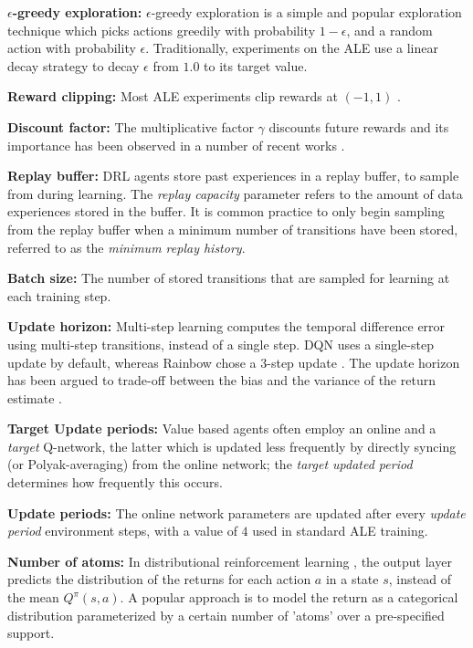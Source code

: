{\bf $\epsilon$-greedy exploration: } 
$\epsilon$-greedy exploration is a simple and popular exploration technique which picks actions greedily with probability $1-\epsilon$, and a random action with probability $\epsilon$. Traditionally, experiments on the ALE use a linear decay strategy to decay $\epsilon$ from $1.0$ to its target value.

{\bf Reward clipping: } 
Most ALE experiments clip rewards at $(-1, 1)$ \citep{mnih2015humanlevel}.

{\bf Discount factor: } 
The multiplicative factor $\gamma$ discounts future rewards and its importance has been observed in a number of recent works \citep{amit2020discount, hessel19inductive, gelada2019off, vanseijen2019using, francoislavet2016discount,schwarzer23a}.

{\bf Replay buffer: }  
DRL agents  store past experiences in a replay buffer, to sample from during learning. The {\em replay capacity} parameter refers to the amount of data experiences stored in the buffer. 
It is common practice to only begin sampling from the replay buffer when a minimum number of transitions have been stored, referred to as the {\em minimum replay history}.


{\bf Batch size: } 
The number of stored transitions that are sampled for learning at each training step.

{\bf Update horizon: }
Multi-step learning \citep{sutton88learning} computes the temporal difference error using multi-step transitions, instead of a single step. DQN uses a single-step update by default, whereas Rainbow chose a 3-step update \citep{Hessel2018RainbowCI}. The update horizon has been argued to trade-off between the bias and the variance of the return estimate \citep{biasandvariance_kea}. 


{\bf Target Update periods: }
Value based agents often employ an online and a {\em target} Q-network, the latter which is updated less frequently by directly syncing (or Polyak-averaging) from the online network; the {\em target updated period} determines how frequently this occurs.


{\bf Update periods: }
The online network parameters are updated after every {\em update period} environment steps, with a value of $4$ used in standard ALE training.

{\bf Number of atoms: } 
In distributional reinforcement learning \citep{Bellemare2017ADP}, the output layer predicts the distribution of the returns for each action $a$ in a state $s$, instead of the mean $Q^{\pi}(s, a)$. A popular approach is to model the return as a categorical distribution parameterized by a certain number of 'atoms' over a pre-specified support. 


